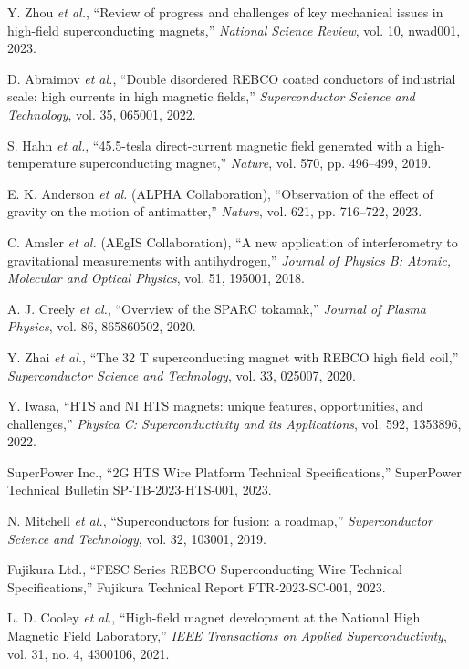 \documentclass[10pt,twocolumn]{article}
\begin{document}
\begin{thebibliography}{25}

Y. Zhou \emph{et al.}, ``Review of progress and challenges of key mechanical issues in high-field superconducting magnets,'' \textit{National Science Review}, vol. 10, nwad001, 2023.

D. Abraimov \emph{et al.}, ``Double disordered REBCO coated conductors of industrial scale: high currents in high magnetic fields,'' \textit{Superconductor Science and Technology}, vol. 35, 065001, 2022.

S. Hahn \emph{et al.}, ``45.5-tesla direct-current magnetic field generated with a high-temperature superconducting magnet,'' \textit{Nature}, vol. 570, pp. 496--499, 2019.

E. K. Anderson \emph{et al.} (ALPHA Collaboration), ``Observation of the effect of gravity on the motion of antimatter,'' \textit{Nature}, vol. 621, pp. 716--722, 2023.

C. Amsler \emph{et al.} (AEgIS Collaboration), ``A new application of interferometry to gravitational measurements with antihydrogen,'' \textit{Journal of Physics B: Atomic, Molecular and Optical Physics}, vol. 51, 195001, 2018.

A. J. Creely \emph{et al.}, ``Overview of the SPARC tokamak,'' \textit{Journal of Plasma Physics}, vol. 86, 865860502, 2020.

Y. Zhai \emph{et al.}, ``The 32 T superconducting magnet with REBCO high field coil,'' \textit{Superconductor Science and Technology}, vol. 33, 025007, 2020.

Y. Iwasa, ``HTS and NI HTS magnets: unique features, opportunities, and challenges,'' \textit{Physica C: Superconductivity and its Applications}, vol. 592, 1353896, 2022.

SuperPower Inc., ``2G HTS Wire Platform Technical Specifications,'' SuperPower Technical Bulletin SP-TB-2023-HTS-001, 2023.

N. Mitchell \emph{et al.}, ``Superconductors for fusion: a roadmap,'' \textit{Superconductor Science and Technology}, vol. 32, 103001, 2019.

Fujikura Ltd., ``FESC Series REBCO Superconducting Wire Technical Specifications,'' Fujikura Technical Report FTR-2023-SC-001, 2023.

L. D. Cooley \emph{et al.}, ``High-field magnet development at the National High Magnetic Field Laboratory,'' \textit{IEEE Transactions on Applied Superconductivity}, vol. 31, no. 4, 4300106, 2021.


\end{thebibliography}
\end{document}
